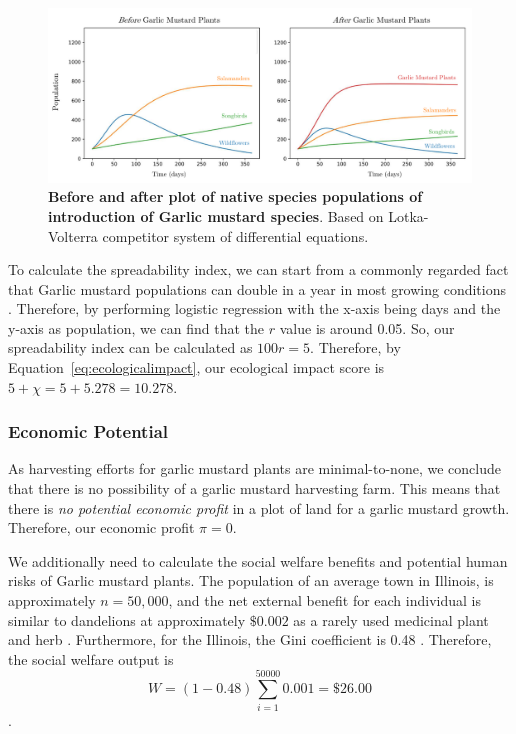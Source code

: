 \begin{figure}[h!]
\centering
    \includegraphics[scale=0.5]{figures/lotkavolterragarlicmustard.pdf}
    \captionsetup{width=0.9\textwidth}
    \caption{\textbf{Before and after plot of native species populations of introduction of Garlic mustard species}. Based on Lotka-Volterra competitor system of differential equations.}
    \label{fig:lotkavolterragarlicmustard}
\end{figure}

To calculate the spreadability index, we can start from a commonly regarded fact that Garlic mustard populations can double in a year in most growing conditions \cite{fmrInvasiveSpecies}. Therefore, by performing logistic regression with the x-axis being days and the y-axis as population, we can find that the \(r\) value is around 0.05. So, our spreadability index can be calculated as \(100r = 5\). Therefore, by Equation~\ref{eq:ecologicalimpact}, our ecological impact score is \(5 + \chi = 5 + 5.278 = 10.278\).

\subsubsection{Economic Potential}

As harvesting efforts for garlic mustard plants are minimal-to-none, we conclude that there is no possibility of a garlic mustard harvesting farm. This means that there is \textit{no potential economic profit} in a plot of land for a garlic mustard growth. Therefore, our economic profit \(\pi = 0\).

We additionally need to calculate the social welfare benefits and potential human risks of Garlic mustard plants. The population of an average town in Illinois, is approximately \(n = 50,000\), and the net external benefit for each individual is similar to dandelions at approximately \(\$0.002\) as a rarely used medicinal plant and herb \cite{fmrInvasiveSpecies}. Furthermore, for the Illinois, the Gini coefficient is 0.48 \cite{247wallstIncomeInequality}. Therefore, the social welfare output is \[W = (1- 0.48) \sum_{i = 1}^{50000} 0.001 = \$26.00\].

